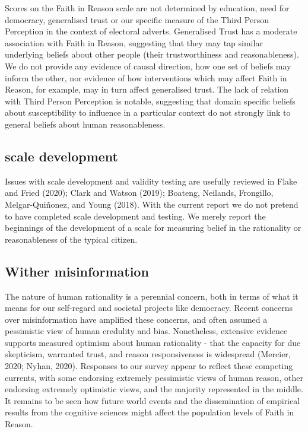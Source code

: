 \documentclass[
  ,jou,floatsintext]{apa6}
\begin{document}
Scores on the Faith in Reason scale are not determined by education, need for democracy, generalised trust or our specific measure of the Third Person Perception in the context of electoral adverts. Generalised Trust has a moderate association with Faith in Reason, suggesting that they may tap similar underlying beliefs about other people (their trustworthiness and reasonableness). We do not provide any evidence of causal direction, how one set of beliefs may inform the other, nor evidence of how interventions which may affect Faith in Reason, for example, may in turn affect generalised trust. The lack of relation with Third Person Perception is notable, suggesting that domain specific beliefs about susceptibility to influence in a particular context do not strongly link to general beliefs about human reasonableness.

\hypertarget{scale-development}{%
\subsection{scale development}\label{scale-development}}

Issues with scale development and validity testing are usefully reviewed in Flake and Fried (2020); Clark and Watson (2019); Boateng, Neilands, Frongillo, Melgar-Quiñonez, and Young (2018). With the current report we do not pretend to have completed scale development and testing. We merely report the beginnings of the development of a scale for measuring belief in the rationality or reasonableness of the typical citizen.

\hypertarget{wither-misinformation}{%
\subsection{Wither misinformation}\label{wither-misinformation}}

The nature of human rationality is a perennial concern, both in terms of what it means for our self-regard and societal projects like democracy. Recent concerns over misinformation have amplified these concerns, and often assumed a pessimistic view of human credulity and bias. Nonetheless, extensive evidence supports measured optimism about human rationality - that the capacity for due skepticism, warranted trust, and reason responsiveness is widespread (Mercier, 2020; Nyhan, 2020). Responses to our survey appear to reflect these competing currents, with some endorsing extremely pessimistic views of human reason, other endorsing extremely optimistic views, and the majority represented in the middle. It remains to be seen how future world events and the dissemination of empirical results from the cognitive sciences might affect the population levels of Faith in Reason.
\end{document}
